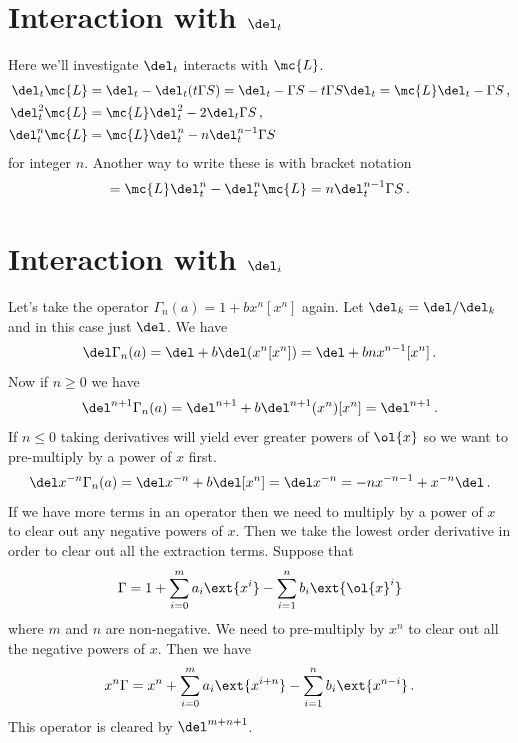 \section{Interaction with $\del_t$}
Here we'll investigate $\del_t$ interacts with $\mc{L}$.
\begin{align}
	\del_t \mc{L} &= \del_t - \del_t(t\Gamma S) = \del_t - \Gamma S- t\Gamma S\del_t = \mc{L}\del_t - \Gamma S\,,\\
	\del_t^2 \mc{L} &= \mc{L}\del_t^2 - 2\del_t \Gamma S\,,\\
	\del_t^n \mc{L} &=\mc{L} \del_t^n - n\del_t^{n-1}\Gamma S
\end{align}
for integer $n$. Another way to write these is with bracket notation
\begin{align}
	[\mc{L},\del_t^n] = \mc{L}\del_t^n-\del_t^n\mc{L} = n\del_t^{n-1}\Gamma S\,.
\end{align}

\section{Interaction with $\del_i$}
Let's take the operator $\Gamma_n(a) = 1 + b x^n[x^n]$ again. Let $\del_k = \del/\del_k$ and in this case just $\del$. We have
\begin{align}
	\del \Gamma_n(a) = \del + b\del(x^n[x^n]) = \del + bnx^{n-1}[x^n]\,.
\end{align}
Now if $n\ge 0$ we have
\begin{align}
	\del^{n+1}\Gamma_n(a)  = \del^{n+1} + b\del^{n+1}(x^n)[x^n] = \del^{n+1}\,.
\end{align}
If $n\leq 0$ taking derivatives will yield ever greater powers of $\ol{x}$ so we want to pre-multiply by a power of $x$ first.
\begin{align}
	\del x^{-n} \Gamma_{n}(a) = \del x^{-n} + b\del [x^n] = \del x^{-n} = -nx^{-n-1} + x^{-n}\del\,.
\end{align}
If we have more terms in an operator then we need to multiply by a power of $x$ to clear out any negative powers of $x$. Then we take the lowest order derivative in order to clear out all the extraction terms. Suppose that
\begin{align}
	\Gamma = 1 + \sum_{i=0}^{m} a_i \ext{x^i} - \sum_{i=1}^n b_i\ext{\ol{x}^i}
\end{align}
where $m$ and $n$ are non-negative. We need to pre-multiply by $x^n$ to clear out all the negative powers of $x$. Then we have
\begin{align}
	x^n\Gamma = x^n + \sum_{i=0}^{m} a_i \ext{x^{i+n}} - \sum_{i=1}^n b_i\ext{x^{n-i}}\,.
\end{align}
This operator is cleared by $\del^{m+n+1}$.
\endinput

